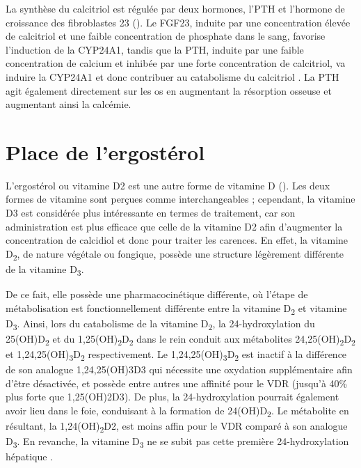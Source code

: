 \documentclass[
  a4paper,
  DIV=11,
  numbers=noendperiod,
  listof=totoc]{scrreprt}
\begin{document}
La synthèse du calcitriol est régulée par deux hormones, l'\acf{PTH} et
l'hormone de croissance des fibroblastes 23 (). Le
\ac{FGF23}, induite par une concentration élevée de calcitriol et une
faible concentration de phosphate dans le sang, favorise l'induction de
la \ac{CYP24A1}, tandis que la \ac{PTH}, induite par une faible
concentration de calcium et inhibée par une forte concentration de
calcitriol, va induire la \ac{CYP24A1} et donc contribuer au catabolisme
du calcitriol \autocite{Dankers.2017,Christakos.2010}. La \ac{PTH} agit
également directement sur les os en augmentant la résorption osseuse et
augmentant ainsi la calcémie.

\section{Place de l'ergostérol}\label{place-de-lergostuxe9rol}

L'ergostérol ou vitamine D2 est une autre forme de vitamine D
(). Les deux formes de vitamine sont perçues comme
interchangeables ; cependant, la vitamine D3 est considérée plus
intéressante en termes de traitement, car son administration est plus
efficace que celle de la vitamine D2 afin d'augmenter la concentration
de calcidiol et donc pour traiter les carences. En effet, la vitamine
D\textsubscript{2}, de nature végétale ou fongique, possède une
structure légèrement différente de la vitamine D\textsubscript{3}.

De ce fait, elle possède une pharmacocinétique différente, où l'étape de
métabolisation est fonctionnellement différente entre la vitamine
D\textsubscript{2} et vitamine D\textsubscript{3}. Ainsi, lors du
catabolisme de la vitamine D\textsubscript{2}, la 24-hydroxylation du
25(OH)D\textsubscript{2} et du
1,25(OH)\textsubscript{2}D\textsubscript{2} dans le rein conduit aux
métabolites 24,25(OH)\textsubscript{2}D\textsubscript{2} et
1,24,25(OH)\textsubscript{3}D\textsubscript{2} respectivement. Le
1,24,25(OH)\textsubscript{3}D\textsubscript{2} est inactif à la
différence de son analogue \ac{1,24,25(OH)3D3} qui nécessite une
oxydation supplémentaire afin d'être désactivée, et possède entre autres
une affinité pour le \ac{VDR} (jusqu'à 40\% plus forte que
\ac{1,25(OH)2D3}). De plus, la 24-hydroxylation pourrait également avoir
lieu dans le foie, conduisant à la formation de
24(OH)D\textsubscript{2}. Le métabolite en résultant, la
1,24(OH)\textsubscript{2}D2, est moins affin pour le \ac{VDR} comparé à
son analogue D\textsubscript{3}. En revanche, la vitamine
D\textsubscript{3} ne se subit pas cette première 24-hydroxylation
hépatique \autocite{Houghton.2006}.
\end{document}
